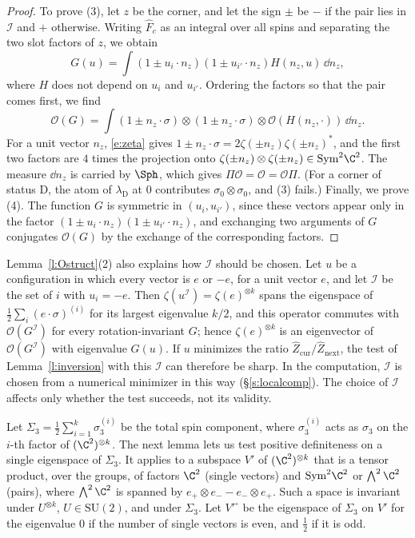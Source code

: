 \begin{proof}
To prove (3), let $z$ be the corner, and let the sign $\pm$ be $-$ if the pair lies in $\mathcal I$ and $+$ otherwise. Writing $\hat F_c$ as an integral over all spins and separating the two slot factors of $z$, we obtain
\begin{equation*}
G(u) = \int (1 \pm u_i \cdot n_z)(1 \pm u_{i'} \cdot n_z) H(n_z, u) \, \dd n_z ,
\end{equation*}
where $H$ does not depend on $u_i$ and $u_{i'}$. Ordering the factors so that the pair comes first, we find
\begin{equation*}
\mathcal O(G) = \int (1 \pm n_z \cdot \sigma) \otimes (1 \pm n_z \cdot \sigma) \otimes \mathcal O(H(n_z, \cdot)) \, \dd n_z .
\end{equation*}
For a unit vector $n_z$, \eqref{e:zeta} gives $1 \pm n_z \cdot \sigma = 2 \zeta(\pm n_z) \zeta(\pm n_z)^*$, and the first two factors are $4$ times the projection onto $\zeta(\pm n_z) \otimes \zeta(\pm n_z) \in \mathrm{Sym}^2 \C^2$. The measure $\dd n_z$ is carried by $\Sph$, which gives $\Pi \mathcal O = \mathcal O = \mathcal O \Pi$. (For a corner of status $\mathrm D$, the atom of $\lambda_{\mathrm D}$ at $0$ contributes $\sigma_0 \otimes \sigma_0$, and (3) fails.) Finally, we prove (4). The function $G$ is symmetric in $(u_i, u_{i'})$, since these vectors appear only in the factor $(1 \pm u_i \cdot n_z)(1 \pm u_{i'} \cdot n_z)$, and exchanging two arguments of $G$ conjugates $\mathcal O(G)$ by the exchange of the corresponding factors.
\end{proof}

Lemma~\ref{l:Ostruct}(2) also explains how $\mathcal I$ should be chosen. Let $u$ be a configuration in which every vector is $e$ or $-e$, for a unit vector $e$, and let $\mathcal I$ be the set of $i$ with $u_i = -e$. Then $\zeta(u^{\mathcal I}) = \zeta(e)^{\otimes k}$ spans the eigenspace of $\frac12 \sum_i (e \cdot \sigma)^{(i)}$ for its largest eigenvalue $k/2$, and this operator commutes with $\mathcal O(G^{\mathcal I})$ for every rotation-invariant $G$; hence $\zeta(e)^{\otimes k}$ is an eigenvector of $\mathcal O(G^{\mathcal I})$ with eigenvalue $G(u)$. If $u$ minimizes the ratio $\hat Z_{\mathrm{cur}} / \hat Z_{\mathrm{next}}$, the test of Lemma~\ref{l:inversion} with this $\mathcal I$ can therefore be sharp. In the computation, $\mathcal I$ is chosen from a numerical minimizer in this way (\S\ref{s:localcomp}). The choice of $\mathcal I$ affects only whether the test succeeds, not its validity.

Let $\Sigma_3 = \frac12 \sum_{i = 1}^k \sigma_3^{(i)}$ be the total spin component, where $\sigma_3^{(i)}$ acts as $\sigma_3$ on the $i$-th factor of $(\C^2)^{\otimes k}$. The next lemma lets us test positive definiteness on a single eigenspace of $\Sigma_3$. It applies to a subspace $V'$ of $(\C^2)^{\otimes k}$ that is a tensor product, over the groups, of factors $\C^2$ (single vectors) and $\mathrm{Sym}^2 \C^2$ or $\bigwedge^2 \C^2$ (pairs), where $\bigwedge^2 \C^2$ is spanned by $e_+ \otimes e_- - e_- \otimes e_+$. Such a space is invariant under $U^{\otimes k}$, $U \in \mathrm{SU}(2)$, and under $\Sigma_3$. Let $V'^{\circ}$ be the eigenspace of $\Sigma_3$ on $V'$ for the eigenvalue $0$ if the number of single vectors is even, and $\frac12$ if it is odd.

